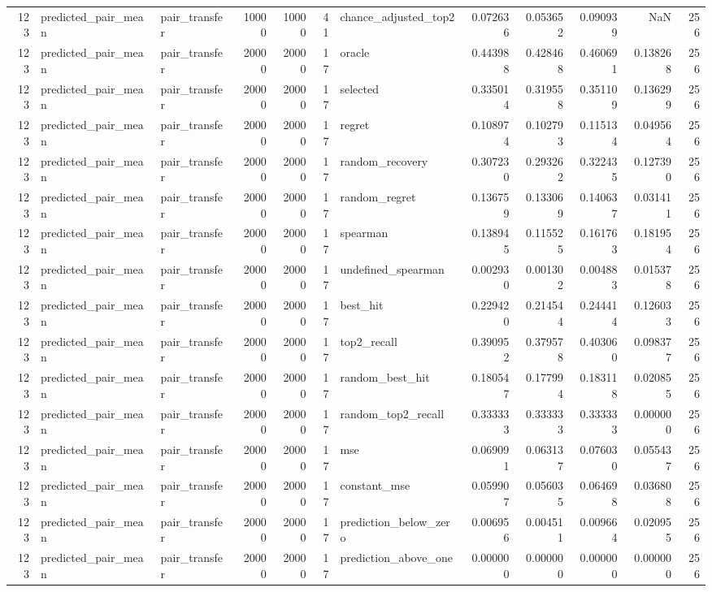 \begin{tabular}{rllrrrlrrrrr}
123 & predicted_pair_mean & pair_transfer & 10000 & 10000 & 41 & chance_adjusted_top2 & 0.072636 & 0.053652 & 0.090939 & NaN & 256 \\
123 & predicted_pair_mean & pair_transfer & 20000 & 20000 & 17 & oracle & 0.443988 & 0.428468 & 0.460691 & 0.138268 & 256 \\
123 & predicted_pair_mean & pair_transfer & 20000 & 20000 & 17 & selected & 0.335014 & 0.319558 & 0.351109 & 0.136299 & 256 \\
123 & predicted_pair_mean & pair_transfer & 20000 & 20000 & 17 & regret & 0.108974 & 0.102793 & 0.115134 & 0.049564 & 256 \\
123 & predicted_pair_mean & pair_transfer & 20000 & 20000 & 17 & random_recovery & 0.307230 & 0.293262 & 0.322435 & 0.127390 & 256 \\
123 & predicted_pair_mean & pair_transfer & 20000 & 20000 & 17 & random_regret & 0.136759 & 0.133069 & 0.140637 & 0.031411 & 256 \\
123 & predicted_pair_mean & pair_transfer & 20000 & 20000 & 17 & spearman & 0.138945 & 0.115525 & 0.161763 & 0.181954 & 256 \\
123 & predicted_pair_mean & pair_transfer & 20000 & 20000 & 17 & undefined_spearman & 0.002930 & 0.001302 & 0.004883 & 0.015378 & 256 \\
123 & predicted_pair_mean & pair_transfer & 20000 & 20000 & 17 & best_hit & 0.229420 & 0.214544 & 0.244414 & 0.126033 & 256 \\
123 & predicted_pair_mean & pair_transfer & 20000 & 20000 & 17 & top2_recall & 0.390952 & 0.379578 & 0.403060 & 0.098377 & 256 \\
123 & predicted_pair_mean & pair_transfer & 20000 & 20000 & 17 & random_best_hit & 0.180547 & 0.177994 & 0.183118 & 0.020855 & 256 \\
123 & predicted_pair_mean & pair_transfer & 20000 & 20000 & 17 & random_top2_recall & 0.333333 & 0.333333 & 0.333333 & 0.000000 & 256 \\
123 & predicted_pair_mean & pair_transfer & 20000 & 20000 & 17 & mse & 0.069091 & 0.063137 & 0.076030 & 0.055437 & 256 \\
123 & predicted_pair_mean & pair_transfer & 20000 & 20000 & 17 & constant_mse & 0.059907 & 0.056035 & 0.064698 & 0.036808 & 256 \\
123 & predicted_pair_mean & pair_transfer & 20000 & 20000 & 17 & prediction_below_zero & 0.006956 & 0.004511 & 0.009664 & 0.020955 & 256 \\
123 & predicted_pair_mean & pair_transfer & 20000 & 20000 & 17 & prediction_above_one & 0.000000 & 0.000000 & 0.000000 & 0.000000 & 256 \\

\end{tabular}
